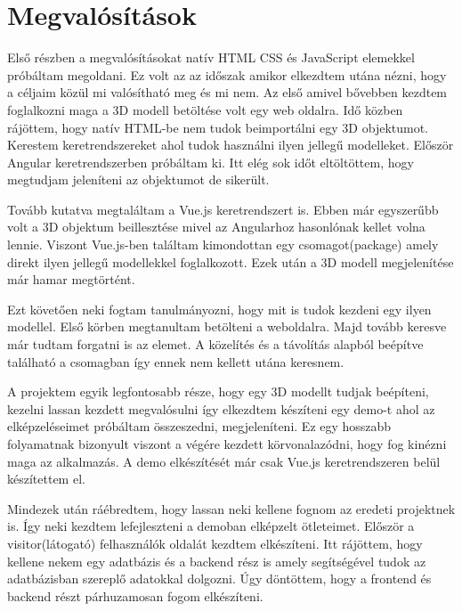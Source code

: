 \section{Megvalósítások}
Első részben a megvalósításokat natív HTML CSS és JavaScript elemekkel próbáltam megoldani. Ez volt az az időszak amikor elkezdtem utána nézni, hogy a céljaim közül mi valósítható meg és mi nem. Az első amivel bővebben kezdtem foglalkozni maga a 3D modell betöltése volt egy web oldalra. Idő közben rájöttem, hogy natív HTML-be nem tudok beimportálni egy 3D objektumot. Kerestem keretrendszereket ahol tudok használni ilyen jellegű modelleket. Először Angular keretrendszerben próbáltam ki. Itt elég sok időt eltöltöttem, hogy megtudjam jeleníteni az objektumot de sikerült.

Tovább kutatva megtaláltam a Vue.js keretrendszert is. Ebben már egyszerűbb volt a 3D objektum beillesztése mivel az Angularhoz hasonlónak kellet volna lennie. Viszont Vue.js-ben találtam kimondottan egy csomagot(package) amely direkt ilyen jellegű modellekkel foglalkozott. Ezek után a 3D modell megjelenítése már hamar megtörtént. 

Ezt követően neki fogtam tanulmányozni, hogy mit is tudok kezdeni egy ilyen modellel. Első körben megtanultam betölteni a weboldalra. Majd tovább keresve már tudtam forgatni is az elemet. A közelítés és a távolítás alapból beépítve található a csomagban így ennek nem kellett utána keresnem.

A projektem egyik legfontosabb része, hogy egy 3D modellt tudjak beépíteni, kezelni lassan kezdett megvalósulni így elkezdtem készíteni egy demo-t ahol az elképzeléseimet próbáltam összeszedni, megjeleníteni. Ez egy hosszabb folyamatnak bizonyult viszont a végére kezdett körvonalazódni, hogy fog kinézni maga az alkalmazás. A demo elkészítését már csak Vue.js keretrendszeren belül készítettem el.

Mindezek után ráébredtem, hogy lassan neki kellene fognom az eredeti projektnek is. Így neki kezdtem lefejleszteni a demoban elképzelt ötleteimet. Először a visitor(látogató) felhasználók oldalát kezdtem elkészíteni. Itt rájöttem, hogy kellene nekem egy adatbázis és a backend rész is amely segítségével tudok az adatbázisban szereplő adatokkal dolgozni. Úgy döntöttem, hogy a frontend és backend részt párhuzamosan fogom elkészíteni.


